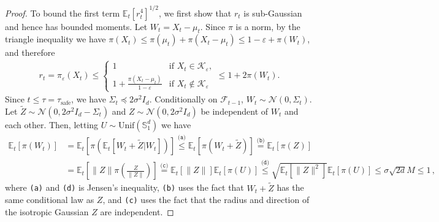 \documentclass[11pt]{article}
\newcommand{\reason}[1]{\texttt{(#1)}}
\newcommand{\explan}[2]{\stackrel{\reason{#2}}{#1}}
\newcommand{\E}{\mathbb E}
\newcommand{\K}{\mathcal K}
\newcommand{\F}{\mathcal F}
\newcommand{\N}{\mathcal N}
\newcommand{\1}{\mathbf 1}
\newcommand{\eps}{\varepsilon}
\begin{document}
\begin{proof}
    To bound the first term $\E_t[r_t^4]^{1/2}$, we first show that $r_t$ is sub-Gaussian and hence has bounded moments.
    Let $W_t=X_t-\mu_t$. Since $\pi$ is a norm, by the triangle inequality we have
    $\pi(X_t) \leq \pi(\mu_t) + \pi(X_t - \mu_t) \leq 1 - \eps + \pi(W_t)$, and therefore
    \begin{align}
        r_t
        =
        \pi_\eps(X_t)
        \leq
        \begin{cases}
            1                                     & \text{if }X_t\in\K_\eps,   \\
            1 + \frac{\pi(X_t - \mu_t)}{1 - \eps} & \text{if }X_t\notin\K_\eps
        \end{cases}
        \leq
        1 + 2\pi(W_t).
    \end{align}
    Since $t\leq\tau=\tau_{\mathrm{safe}}$, we have
    $\Sigma_t\preceq 2\sigma^2I_d$. Conditionally on $\F_{t-1}$,
    $W_t\sim\N(0,\Sigma_t)$. Let
    $\tilde Z\sim\N(0,2\sigma^2I_d-\Sigma_t)$ and
    $Z\sim\N(0,2\sigma^2I_d)$ be independent of $W_t$ and each other.
    Then, letting $U \sim \text{Unif}(\mathbb{S}_1^d)$ we have
    \begin{align}
        \E_t[\pi(W_t)]
         & =
        \E_t\left[\pi(\E_t[W_t + \tilde Z | W_t])\right]
        \explan{\leq}{a}
        \E_t\left[\pi(W_t + \tilde Z)\right]
        \explan{=}{b}
        \E_t\left[\pi(Z)\right] \\
         & =
        \E_t\left[\|Z\| \pi\left(\frac{Z}{\|Z\|}\right)\right]
        \explan{=}{c}
        \E_t[\|Z\|]\E_t[\pi(U)]
        \explan{\leq}{d}
        \sqrt{\E_t\left[\|Z\|^2\right]} \E_t\left[\pi\left(U\right)\right]
        \leq
        \sigma \sqrt{2d} M
        \leq 1\,,
    \end{align}
    where \reason{a} and \reason{d} is Jensen's inequality, \reason{b} uses the fact that $W_t+\tilde Z$ has the same conditional law as $Z$, and \reason{c} uses the fact that the radius and direction of the isotropic Gaussian $Z$ are independent.



\end{proof}
\end{document}
